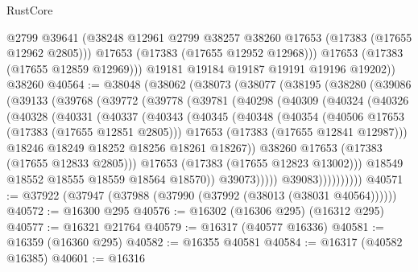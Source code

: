\begin{lexlean}{RustCore}
\begin{coremodule}
            @2799
            @39641
            (@38248 @12961 @2799 @38257 @38260 @17653 (@17383 (@17655 @12962 @2805)))
            @17653
            (@17383 (@17655 @12952 @12968)))
          @17653
          (@17383 (@17655 @12859 @12969)))
        @19181
        @19184
        @19187
        @19191
        @19196
        @19202))
    @38260
@40564 := @38048
    (@38062
      (@38073
        (@38077
          (@38195
            (@38280
              (@39086
                (@39133
                  (@39768
                    (@39772
                      (@39778
                        (@39781
                          (@40298
                            (@40309
                              (@40324
                                (@40326
                                  (@40328
                                    (@40331
                                      (@40337
                                        (@40343
                                          (@40345
                                            (@40348
                                              (@40354
                                                (@40506 @17653 (@17383 (@17655 @12851 @2805)))
                                                @17653
                                                (@17383 (@17655 @12841 @12987)))
                                              @18246
                                              @18249
                                              @18252
                                              @18256
                                              @18261
                                              @18267))
                                          @38260
                                          @17653
                                          (@17383 (@17655 @12833 @2805)))
                                        @17653
                                        (@17383 (@17655 @12823 @13002)))
                                      @18549
                                      @18552
                                      @18555
                                      @18559
                                      @18564
                                      @18570))
                                  @39073)))))
                        @39083))))))))))
@40571 := @37922 (@37947 (@37988 (@37990 (@37992 (@38013 (@38031 @40564))))))
@40572 := @16300 @295
@40576 := @16302 (@16306 @295) (@16312 @295)
@40577 := @16321 @21764
@40579 := @16317 (@40577 @16336)
@40581 := @16359 (@16360 @295)
@40582 := @16355 @40581
@40584 := @16317 (@40582 @16385)
@40601 := @16316

\end{coremodule}
\end{lexlean}
